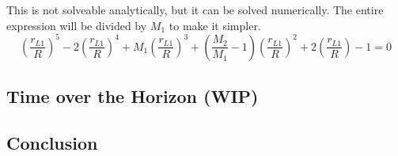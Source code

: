 \documentclass[../basicOrbitalDynamics.tex]{subfiles}
\begin{document}
This is not solveable analytically, but it can be solved numerically. The entire expression will be divided by $M_1$ to make it simpler.
\begin{equation}\label{L1 Equation}
    \left(\frac{r_{L1}}{R}\right)^5-2\left(\frac{r_{L1}}{R}\right)^4+M_1\left(\frac{r_{L1}}{R}\right)^3+\left(\frac{M_2}{M_1}-1\right)\left(\frac{r_{L1}}{R}\right)^2+2\left(\frac{r_{L1}}{R}\right)-1= 0
\end{equation}

\bigskip\bigskip
\subsection{Time over the Horizon (WIP)}


\bigskip\bigskip
\subsection{Conclusion}
\end{document}

